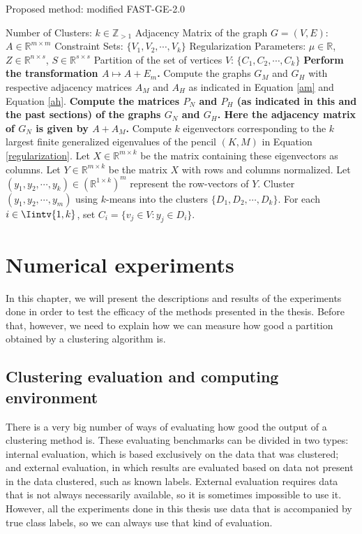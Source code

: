 \begin{algorithm}
\caption{Proposed method: modified FAST-GE-2.0}\label{proposed_algorithm}
\begin{algorithmic}[1]
   \INPUT
      \Statex Number of Clusters: $k \in \mathbb Z_{>1}$
      \Statex Adjacency Matrix of the graph $G=(V,E)$: $A \in \mathbb R ^ {m \times m}$ 
      \Statex Constraint Sets: $\{ V_1, V_2, \cdots, V_k \}$
      \Statex Regularization Parameters: $\mu \in \mathbb R$, $Z \in \mathbb R ^{n \times s}$, $S \in \mathbb R ^{s \times s}$
   \OUTPUT
      \Statex Partition of the set of vertices $V$: $\{ C_1, C_2, \cdots, C_k \} $
      \vspace{0.2 cm}
   \State \textbf{\color{blue} Perform the transformation $A \longmapsto A + E_m$.}
   \State Compute the graphs $G_M$ and $G_H$ with respective adjacency matrices $A_M$ and $A_H$ as indicated in Equation \vref{am} and Equation \vref{ah}.
   \State \textbf{\color{blue} Compute the matrices $P_N$ and $P_H$ (as indicated in this and the past sections) of the graphs $G_N$ and $G_H$. Here the adjacency matrix of $G_N$ is given by $A + A_M$.}
   \State Compute $k$ eigenvectors corresponding to the $k$ largest finite generalized eigenvalues of the pencil $(K,M)$ in Equation \vref{regularization}. Let $X \in \mathbb R ^{m \times k}$ be the matrix containing these eigenvectors as columns.
   \State Let $Y \in \mathbb R ^{m \times k}$ be the matrix $X$ with rows and columns normalized.
   \State Let $(y_1, y_2, \cdots, y_k) \in (\mathbb R^{1 \times k})^m$ represent the row-vectors of $Y$.
   \State Cluster $(y_1, y_2, \cdots, y_m)$ using $k$-means into the clusters $ \{ D_1, D_2, \cdots, D_k \}$.
   \State For each $i \in \Iintv{1,k}$, set $C_i = \{ v_j \in V: y_j \in D_i \}$.
\end{algorithmic}
\end{algorithm}



\chapter{Numerical experiments} \label{numexp}
In this chapter, we will present the descriptions and results of the experiments done in order to test the efficacy of the methods presented in the thesis. 
Before that, however, we need to explain how we can measure how good a partition obtained by a clustering algorithm is.

\section{Clustering evaluation and computing environment}
There is a very big number of ways of evaluating how good the output of a clustering method is.
These evaluating benchmarks can be divided in two types: internal evaluation, which is based exclusively on the data that was clustered; and external evaluation, in which results are evaluated based on data not present in the data clustered, such as known labels.
External evaluation requires data that is not always necessarily available, so it is sometimes impossible to use it.
However, all the experiments done in this thesis use data that is accompanied by true class labels, so we can always use that kind of evaluation.

